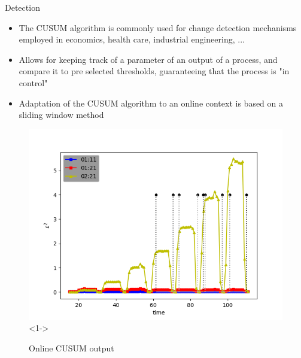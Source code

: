 \documentclass[aspectratio=43]{beamer}
\begin{document}
\begin{frame}{Detection}
    \begin{itemize}
        \item The CUSUM algorithm is commonly used for change detection mechanisms employed
            in economics, health care, industrial engineering, ...
        \item Allows for keeping track of a parameter of an output of a process, and 
            compare it to pre selected thresholds, guaranteeing that the process is "in control"
        \item<1->Adaptation of the CUSUM algorithm to an online context is based on a sliding window
            method 
    \end{itemize}

    \begin{figure}
        \includegraphics[width=.5\textwidth]{meter_eleph/detection_results_plotted}<1->
        \caption{Online CUSUM output}
    \end{figure}

\end{frame}

\end{document}

